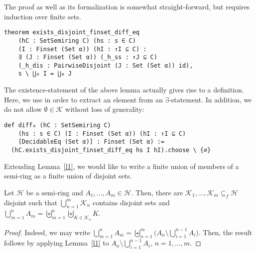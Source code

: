 \documentclass[lean]{DraftAFM}
\begin{document}
The proof as well as its formalization is somewhat straight-forward,
but requires induction over finite sets.

\begin{verbatim}
theorem exists_disjoint_finset_diff_eq
    (hC : SetSemiring C) (hs : s ∈ C)
    (I : Finset (Set α)) (hI : ↑I ⊆ C) :
    ∃ (J : Finset (Set α)) (_h_ss : ↑J ⊆ C)
    (_h_dis : PairwiseDisjoint (J : Set (Set α)) id),
    s \ ⋃₀ I = ⋃₀ J
\end{verbatim}

\noindent
The existence-statement of the above lemma actually gives rise to a
definition. Here, we use  in order to extract
an element from an $\exists$-statement. In addition, we do not allow
$\emptyset \in \mathcal K$ without loss of generality:

\begin{verbatim}
def diff₀ (hC : SetSemiring C)
    (hs : s ∈ C) (I : Finset (Set α)) (hI : ↑I ⊆ C)
    [DecidableEq (Set α)] : Finset (Set α) :=
  (hC.exists_disjoint_finset_diff_eq hs I hI).choose \ {∅}
\end{verbatim}

\noindent
Extending Lemma~\ref{l1}, we would like to write a finite union of
members of a semi-ring as a finite union of disjoint sets.


\begin{lemma}\label{l2}
  Let $\mathcal H$ be a semi-ring and $A_1,...,A_m \in \mathcal
  H$. Then, there are $\mathcal K_1,...,\mathcal K_m \subseteq_f
  \mathcal H$ disjoint such that $\bigcup_{n=1}^m \mathcal K_n$
  contains disjoint sets and $\bigcup_{m=1}^n A_m = \biguplus_{m=1}^n
  \biguplus_{K \in \mathcal K_n} K$.
\end{lemma}

\begin{proof}
  Indeed, we may write $ \bigcup_{m=1}^n A_m = \biguplus_{n=1}^m
  \Big(A_n \setminus \bigcup_{i=1}^{n-1}A_i\Big).$ Then, the result
  follows by applying Lemma~\ref{l1} to $A_n \setminus
  \bigcup_{i=1}^{n-1}A_i$, $n=1,...,m$.
\end{proof}


\end{document}
